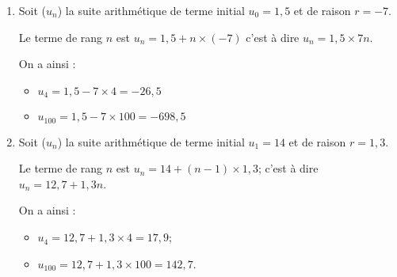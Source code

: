 \begin{myexs}
	\begin{enumerate}
		\item 	Soit ($u_n$) la suite arithmétique de terme initial $u_0 = 1,5$ et de raison $r = -7$.
		
		Le terme de rang $n$ est $u_n = 1,5 + n \times (-7)$ c'est à dire $u_n=1,5 \times 7n$.
		
		On a ainsi : 
		\begin{itemize}
			\item $u_4 = 1,5 - 7 \times 4 = -26,5$
			\item $u_{100} = 1,5 - 7 \times 100 = -698,5$
		\end{itemize}
		
		\item Soit ($u_n$) la suite arithmétique de terme initial $u_1 = 14$ et de raison $r = 1,3$.
		
		Le terme de rang $n$ est $u_n = 14 + (n-1) \times 1,3$; c'est à dire $u_n = 12,7 + 1,3n$.

		On a ainsi : 
		\begin{itemize}
			\item $u_4 = 12,7 + 1,3 \times 4 = 17,9$;
			\item $u_{100} = 12,7 + 1,3 \times 100 = 142,7$.
		\end{itemize}
	\end{enumerate}

	
	
\end{myexs}